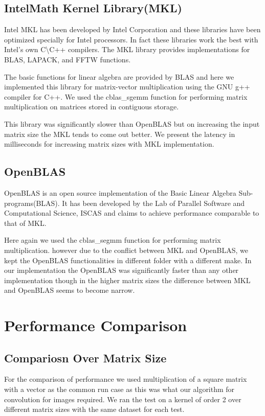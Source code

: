 \documentclass[10pt,a4paper,titlepage]{article}
\begin{document}
\subsection{Intel\circledR Math Kernel Library(MKL)}

Intel MKL has been developed by Intel Corporation and these libraries have been optimized specially for Intel processors. In fact these libraries work the best with Intel's own C\textbackslash C++ compilers. The MKL library provides implementations for BLAS, LAPACK, and FFTW functions.\cite{MKL}

The basic functions for linear algebra are provided by BLAS and here we implemented this library for matrix-vector multiplication using the GNU g++ compiler for C++. We used the cblas\_sgemm function for performing matrix multiplication on matrices stored in contiguous storage.

 
This library was significantly slower than OpenBLAS but on increasing the input matrix size the MKL tends to come out better. We present the latency in milliseconds for increasing matrix sizes with MKL implementation.

\subsection{OpenBLAS}

OpenBLAS is an open source implementation of the Basic Linear Algebra Sub-programs(BLAS). It has been developed by the Lab of Parallel Software and Computational Science, ISCAS and claims to achieve performance comparable to that of MKL.\cite{OpenBLAS}

Here again we used the cblas\_segmm function for performing matrix multiplication. however due to the conflict between MKL and OpenBLAS, we kept the OpenBLAS functionalities in different folder with a different make. In our implementation the OpenBLAS was significantly faster than any other implementation though in the higher matrix sizes the difference between MKL and OpenBLAS seems to become narrow.

\section{Performance Comparison}
\subsection{Compariosn Over Matrix Size}
For the comparison of performance we used multiplication of a square matrix with a vector as the common run case as this was what our algorithm for convolution for images required. We ran the test on a kernel of order 2 over different matrix sizes with the same dataset for each test.
\end{document}
